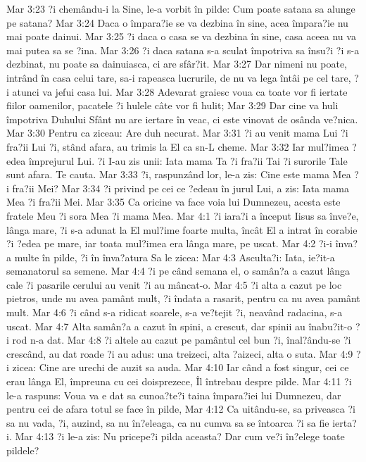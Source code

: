 Mar 3:23  ?i chemându-i la Sine, le-a vorbit în pilde: Cum poate satana sa alunge pe satana?
Mar 3:24  Daca o împara?ie se va dezbina în sine, acea împara?ie nu mai poate dainui.
Mar 3:25  ?i daca o casa se va dezbina în sine, casa aceea nu va mai putea sa se ?ina.
Mar 3:26  ?i daca satana s-a sculat împotriva sa însu?i ?i s-a dezbinat, nu poate sa dainuiasca, ci are sfâr?it.
Mar 3:27  Dar nimeni nu poate, intrând în casa celui tare, sa-i rapeasca lucrurile, de nu va lega întâi pe cel tare, ?i atunci va jefui casa lui.
Mar 3:28  Adevarat graiesc voua ca toate vor fi iertate fiilor oamenilor, pacatele ?i hulele câte vor fi hulit;
Mar 3:29  Dar cine va huli împotriva Duhului Sfânt nu are iertare în veac, ci este vinovat de osânda ve?nica.
Mar 3:30  Pentru ca ziceau: Are duh necurat.
Mar 3:31  ?i au venit mama Lui ?i fra?ii Lui ?i, stând afara, au trimis la El ca sn-L cheme.
Mar 3:32  Iar mul?imea ?edea împrejurul Lui. ?i I-au zis unii: Iata mama Ta ?i fra?ii Tai ?i surorile Tale sunt afara. Te cauta.
Mar 3:33  ?i, raspunzând lor, le-a zis: Cine este mama Mea ?i fra?ii Mei?
Mar 3:34  ?i privind pe cei ce ?edeau în jurul Lui, a zis: Iata mama Mea ?i fra?ii Mei.
Mar 3:35  Ca oricine va face voia lui Dumnezeu, acesta este fratele Meu ?i sora Mea ?i mama Mea.
Mar 4:1  ?i iara?i a început Iisus sa înve?e, lânga mare, ?i s-a adunat la El mul?ime foarte multa, încât El a intrat în corabie ?i ?edea pe mare, iar toata mul?imea era lânga mare, pe uscat.
Mar 4:2  ?i-i înva?a multe în pilde, ?i în înva?atura Sa le zicea:
Mar 4:3  Asculta?i: Iata, ie?it-a semanatorul sa semene.
Mar 4:4  ?i pe când semana el, o samân?a a cazut lânga cale ?i pasarile cerului au venit ?i au mâncat-o.
Mar 4:5  ?i alta a cazut pe loc pietros, unde nu avea pamânt mult, ?i îndata a rasarit, pentru ca nu avea pamânt mult.
Mar 4:6  ?i când s-a ridicat soarele, s-a ve?tejit ?i, neavând radacina, s-a uscat.
Mar 4:7  Alta samân?a a cazut în spini, a crescut, dar spinii au înabu?it-o ?i rod n-a dat.
Mar 4:8  ?i altele au cazut pe pamântul cel bun ?i, înal?ându-se ?i crescând, au dat roade ?i au adus: una treizeci, alta ?aizeci, alta o suta.
Mar 4:9  ?i zicea: Cine are urechi de auzit sa auda.
Mar 4:10  Iar când a fost singur, cei ce erau lânga El, împreuna cu cei doisprezece, Îl întrebau despre pilde.
Mar 4:11  ?i le-a raspuns: Voua va e dat sa cunoa?te?i taina împara?iei lui Dumnezeu, dar pentru cei de afara totul se face în pilde,
Mar 4:12  Ca uitându-se, sa priveasca ?i sa nu vada, ?i, auzind, sa nu în?eleaga, ca nu cumva sa se întoarca ?i sa fie ierta?i.
Mar 4:13  ?i le-a zis: Nu pricepe?i pilda aceasta? Dar cum ve?i în?elege toate pildele?
